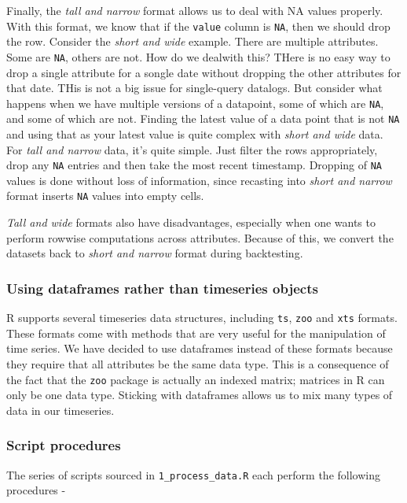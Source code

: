 \documentclass[11pt,preprint, authoryear]{elsarticle}
\numberwithin{equation}{section}
\numberwithin{figure}{section}
\numberwithin{table}{section}
\begin{document}
Finally, the \emph{tall and narrow} format allows us to deal with NA
values properly. With this format, we know that if the \texttt{value}
column is \texttt{NA}, then we should drop the row. Consider the
\emph{short and wide} example. There are multiple attributes. Some are
\texttt{NA}, others are not. How do we dealwith this? THere is no easy
way to drop a single attribute for a songle date without dropping the
other attributes for that date. THis is not a big issue for single-query
datalogs. But consider what happens when we have multiple versions of a
datapoint, some of which are \texttt{NA}, and some of which are not.
Finding the latest value of a data point that is not \texttt{NA} and
using that as your latest value is quite complex with \emph{short and
wide} data. For \emph{tall and narrow} data, it's quite simple. Just
filter the rows appropriately, drop any \texttt{NA} entries and then
take the most recent timestamp. Dropping of \texttt{NA} values is done
without loss of information, since recasting into \emph{short and
narrow} format inserts \texttt{NA} values into empty cells.

\emph{Tall and wide} formats also have disadvantages, especially when
one wants to perform rowwise computations across attributes. Because of
this, we convert the datasets back to \emph{short and narrow} format
during backtesting.

\subsubsection{Using dataframes rather than timeseries
objects}\label{using-dataframes-rather-than-timeseries-objects}

R supports several timeseries data structures, including \texttt{ts},
\texttt{zoo} and \texttt{xts} formats. These formats come with methods
that are very useful for the manipulation of time series. We have
decided to use dataframes instead of these formats because they require
that all attributes be the same data type. This is a consequence of the
fact that the \texttt{zoo} package is actually an indexed matrix;
matrices in R can only be one data type. Sticking with dataframes allows
us to mix many types of data in our timeseries.

\subsubsection{Script procedures}\label{script-procedures}

The series of scripts sourced in \texttt{1\_process\_data.R} each
perform the following procedures -
\end{document}
